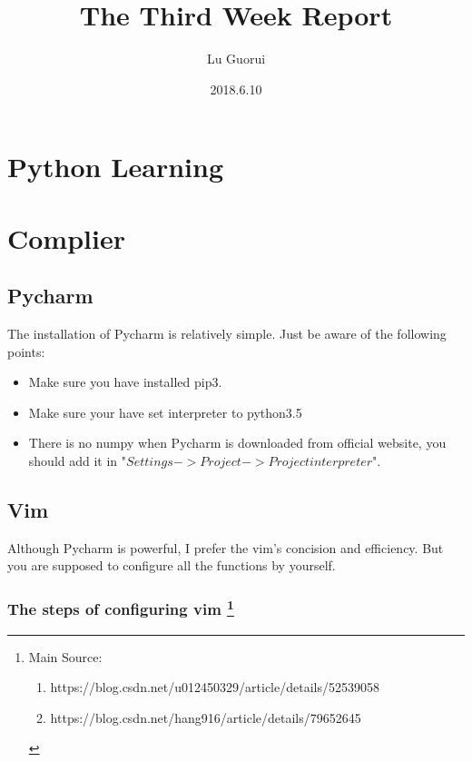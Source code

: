\documentclass{article}
\title{The Third Week Report}
\author{Lu Guorui}
\date{2018.6.10}
\begin{document}
\maketitle
\tableofcontents

\newpage


\section*{Python Learning}

\section{Complier}
\subsection{Pycharm}
The installation of Pycharm is relatively simple. Just be aware of the following points:
\begin{itemize}
\item Make sure you have installed pip3.
\item Make sure your have set interpreter to python3.5
\item There is no numpy when Pycharm is downloaded from official website, you should add it in "$Settings -> Project -> Project interpreter$". 
\end{itemize}

\subsection{Vim}
Although Pycharm is powerful, I prefer the vim's concision and efficiency. But you are supposed to configure all the functions by yourself.

\subsubsection{The steps of configuring vim \protect\footnote{Main Source:
\begin{enumerate}
\item https://blog.csdn.net/u012450329/article/details/52539058
\item https://blog.csdn.net/hang916/article/details/79652645
\end{enumerate}
}}
\end{document}

